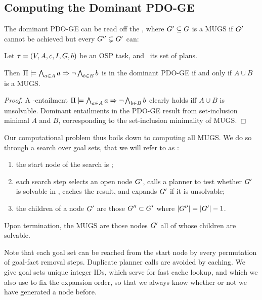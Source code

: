 \subsection{Computing the Dominant PDO-GE}
\label{goaldep:computing}

The dominant PDO-GE can be read off the , where $G' \subseteq G$ is a MUGS if
$G'$ cannot be achieved but every $G'' \subsetneq G'$ can:

\begin{proposition}
Let $\tau =
(V,\allowbreak A,\allowbreak{\ensuremath{c}},\allowbreak I,\allowbreak G,\allowbreak{\ensuremath{b}})$
be an OSP task, and \plans\ its set of plans.  

Then $\Pi \models \bigwedge_{a \in A} a \Rightarrow \neg \bigwedge_{b \in B}
  b$ is in the dominant PDO-GE if and only if $A \cup B$ is a MUGS.
\end{proposition}

\begin{proof}
A \plans-entailment $\Pi \models \bigwedge_{a \in A} a \Rightarrow \neg
  \bigwedge_{b \in B} b$ clearly holds iff $A \cup B$ is
unsolvable. Dominant entailments in the PDO-GE result from
set-inclusion minimal $A$ and $B$, corresponding to the set-inclusion
minimality of MUGS.
\end{proof}

Our computational problem thus boils down to computing all MUGS. We do
so through a search over goal sets, that we will refer to as
:
\begin{enumerate}[(1)]
\item the start node of the search is \goal; 
\item each search step selects an open node $G'$, calls a planner
  to test whether $G'$ is solvable in \task, caches the result,
  and expands $G'$ if it is unsolvable;
\item the children of a node $G'$ are those $G'' \subset
  G'$ where $|G''| = |G'|-1$.
\end{enumerate}
Upon termination, the MUGS are those nodes $G'$ all of whose
children are solvable. 

Note that each goal set can be reached from the start node by every
permutation of goal-fact removal steps. Duplicate planner calls are
avoided by caching. We give goal sets unique integer IDs, which serve
for fast cache lookup, and which we also use to fix the expansion
order, so that we always know whether or not we have generated a node
before.

